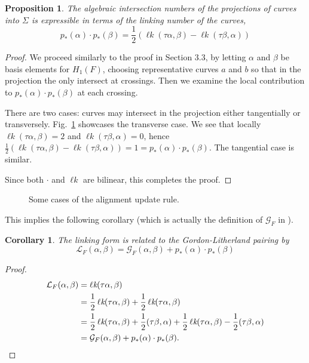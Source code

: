 \documentclass[12pt]{report}
\newcommand{\lk}{\operatorname{\ell\textit{k}}}
\newtheorem*{proposition}{Proposition}
\newtheorem*{corollary}{Corollary}
\theoremstyle{upright}
\begin{document}
\begin{proposition}
	The algebraic intersection numbers of the projections of curves into $\Sigma$ is expressible in terms of the linking number of the curves,
	\[p_{*}(\alpha) \cdot p_{*}(\beta) = \dfrac{1}{2}\left(\lk(\tau \alpha, \beta) - \lk(\tau \beta, \alpha)\right)\]
\end{proposition}

\begin{proof}
	We proceed similarly to the proof in Section 3.3, by letting $\alpha$ and $\beta$ be basis elements for $H_{1}(F)$, choosing representative curves $a$ and $b$ so that in the projection the only intersect at crossings. Then we examine the local contribution to $p_{*}(\alpha) \cdot p_{*}(\beta)$ at each crossing.
	
	There are two cases: curves may intersect in the projection either tangentially or transversely. Fig.~\ref{fig:intersection-number-example} showcases the transverse case. We see that locally $\lk(\tau\alpha, \beta) = 2$ and $\lk(\tau\beta, \alpha) = 0$, hence $\frac{1}{2}(\lk(\tau\alpha, \beta) - \lk(\tau\beta, \alpha)) = 1 = p_{*}(\alpha) \cdot p_{*}(\beta)$. The tangential case is similar.
	
	Since both $\cdot$ and $\lk$ are bilinear, this completes the proof.
\end{proof}

\begin{figure}[hbt!]
	\centering
	\def\svgscale{0.54}
	
	
	\caption{Some cases of the alignment update rule.}
	\label{fig:intersection-number-example}
\end{figure}

This implies the following corollary (which is actually the definition of $\mathcal{G}_{F}$ in \cite{gordon-litherland-pairing-thickened-surfaces}).

\begin{corollary}
The linking form is related to the Gordon-Litherland pairing by
\[\mathcal{L}_{F}(\alpha, \beta) = \mathcal{G}_{F}(\alpha, \beta) + p_{*}(\alpha) \cdot p_{*}(\beta)\]
\end{corollary}

\begin{proof}
\begin{align*}
\mathcal{L}_{F}(\alpha, \beta) & = \lk(\tau \alpha, \beta) \\
& = \dfrac{1}{2}\lk(\tau \alpha, \beta) + \dfrac{1}{2}\lk(\tau \alpha, \beta)\\
& = \dfrac{1}{2}\lk(\tau \alpha, \beta) + \dfrac{1}{2}(\tau \beta, \alpha) + \dfrac{1}{2}\lk(\tau \alpha, \beta) - \dfrac{1}{2}(\tau \beta, \alpha)\\
& = \mathcal{G}_{F}(\alpha, \beta) + p_{*}(\alpha) \cdot p_{*}(\beta). \qedhere
\end{align*}
\end{proof}
\end{document}
